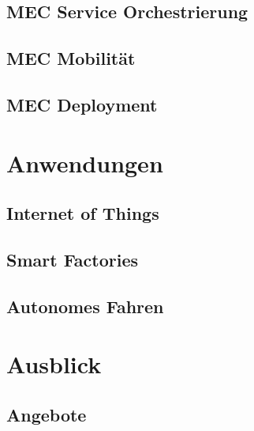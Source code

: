 \documentclass[runningheads]{llncs}
\numberwithin{figure}{section}
\begin{document}
\subsection{MEC Service Orchestrierung}
\label{subsec:MEC Service Orchestrierung}
\subsection{MEC Mobilität}
\label{subsec:MEC Mobilität}
\subsection{MEC Deployment}
\label{subsec:MEC Deployment}


\section{Anwendungen}
\label{sec:Anwendungen}
\subsection{Internet of Things}
\label{subsec:Internet of Things}
\subsection{Smart Factories}
\label{subsec:Smart Factory}
\subsection{Autonomes Fahren}
\label{subsec:Autonomes Fahren}
\section{Ausblick}
\subsection{Angebote}
\label{subsec:Angebote}
\label{sec:Ausblick}


\newpage
%
\printbibliography[heading=bibintoc]
\end{document}
